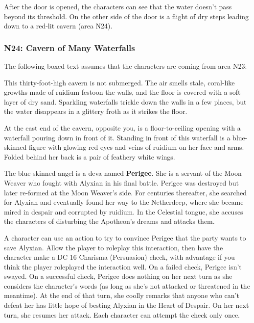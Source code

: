 \documentclass[10pt,a4paper,twoside,bg=print,twocolumn,openany,nodeprecatedcode]{dndbook}
\begin{document}
After the door is opened, the characters can see that the water doesn't pass beyond its threshold. On the other side of the door is a flight of dry steps leading down to a red-lit cavern (area N24).


\subsubsection{N24: Cavern of Many Waterfalls}
The following boxed text assumes that the characters are coming from area N23:

\begin{DndReadAloud}{}
This thirty-foot-high cavern is not submerged. The air smells stale, coral-like growths made of ruidium festoon the walls, and the floor is covered with a soft layer of dry sand. Sparkling waterfalls trickle down the walls in a few places, but the water disappears in a glittery froth as it strikes the floor.

At the east end of the cavern, opposite you, is a floor-to-ceiling opening with a waterfall pouring down in front of it. Standing in front of this waterfall is a blue-skinned figure with glowing red eyes and veins of ruidium on her face and arms. Folded behind her back is a pair of feathery white wings.

\end{DndReadAloud}

The blue-skinned angel is a deva named \textbf{Perigee}. She is a servant of the Moon Weaver who fought with Alyxian in his final battle. Perigee was destroyed but later re-formed at the Moon Weaver's side. For centuries thereafter, she searched for Alyxian and eventually found her way to the Netherdeep, where she became mired in despair and corrupted by ruidium. In the Celestial tongue, she accuses the characters of disturbing the Apotheon's dreams and attacks them.



A character can use an action to try to convince Perigee that the party wants to save Alyxian. Allow the player to roleplay this interaction, then have the character make a DC 16 Charisma (Persuasion) check, with advantage if you think the player roleplayed the interaction well. On a failed check, Perigee isn't swayed. On a successful check, Perigee does nothing on her next turn as she considers the character's words (as long as she's not attacked or threatened in the meantime). At the end of that turn, she coolly remarks that anyone who can't defeat her has little hope of besting Alyxian in the Heart of Despair. On her next turn, she resumes her attack. Each character can attempt the check only once.
\end{document}
